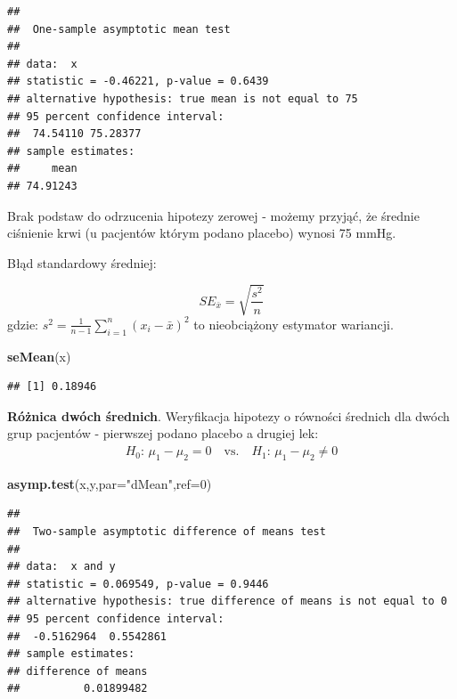 \documentclass[polish,]{book}
\newenvironment{Shaded}{\begin{snugshade}}{\end{snugshade}}
\newcommand{\DataTypeTok}[1]{\textcolor[rgb]{0.13,0.29,0.53}{#1}}
\newcommand{\DecValTok}[1]{\textcolor[rgb]{0.00,0.00,0.81}{#1}}
\newcommand{\KeywordTok}[1]{\textcolor[rgb]{0.13,0.29,0.53}{\textbf{#1}}}
\newcommand{\NormalTok}[1]{#1}
\newcommand{\StringTok}[1]{\textcolor[rgb]{0.31,0.60,0.02}{#1}}
\begin{document}
\begin{verbatim}
## 
##  One-sample asymptotic mean test
## 
## data:  x
## statistic = -0.46221, p-value = 0.6439
## alternative hypothesis: true mean is not equal to 75
## 95 percent confidence interval:
##  74.54110 75.28377
## sample estimates:
##     mean 
## 74.91243
\end{verbatim}

Brak podstaw do odrzucenia hipotezy zerowej - możemy przyjąć, że średnie ciśnienie krwi (u pacjentów którym podano placebo) wynosi 75 mmHg.

Błąd standardowy średniej:

\begin{equation}
SE_{\bar{x}}=\sqrt{\frac{s^2}{n}}
\label{eq:wz1139}
\end{equation}
gdzie: \(s^2=\frac{1}{n-1}\sum_{i=1}^{n}(x_i-\bar{x})^2\) to nieobciążony estymator wariancji.

\begin{Shaded}
\begin{Highlighting}[]
\KeywordTok{seMean}\NormalTok{(x)}
\end{Highlighting}
\end{Shaded}

\begin{verbatim}
## [1] 0.18946
\end{verbatim}

\textbf{Różnica dwóch średnich}. Weryfikacja hipotezy o równości średnich dla dwóch grup pacjentów - pierwszej podano placebo a drugiej lek:
\[
\begin{array}{ll}
H_0:\,\mu_1-\mu_2 = 0\quad\mbox{vs.}\quad H_1:\,\mu_1-\mu_2 \neq 0
\end{array}
\]

\begin{Shaded}
\begin{Highlighting}[]
\KeywordTok{asymp.test}\NormalTok{(x,y,}\DataTypeTok{par=}\StringTok{"dMean"}\NormalTok{,}\DataTypeTok{ref=}\DecValTok{0}\NormalTok{)}
\end{Highlighting}
\end{Shaded}

\begin{verbatim}
## 
##  Two-sample asymptotic difference of means test
## 
## data:  x and y
## statistic = 0.069549, p-value = 0.9446
## alternative hypothesis: true difference of means is not equal to 0
## 95 percent confidence interval:
##  -0.5162964  0.5542861
## sample estimates:
## difference of means 
##          0.01899482
\end{verbatim}
\end{document}
